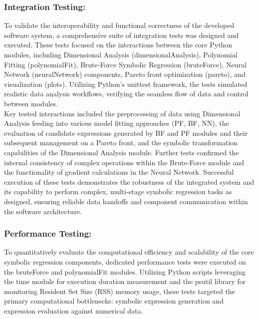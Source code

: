 \documentclass{article}
\begin{document}
\subsubsection{Integration Testing: }


To validate the interoperability and functional correctness of the developed software system, a comprehensive suite of integration tests was designed and executed. These tests focused on the interactions between the core Python modules, including Dimensional Analysis (dimensionalAnalysis), Polynomial Fitting (polynomialFit), Brute-Force Symbolic Regression (bruteForce), Neural Network (neuralNetwork) components, Pareto front optimization (pareto), and visualization (plots). Utilizing Python's unittest framework, the tests simulated realistic data analysis workflows, verifying the seamless flow of data and control between modules.\\

Key tested interactions included the preprocessing of data using Dimensional Analysis feeding into various model fitting approaches (PF, BF, NN), the evaluation of candidate expressions generated by BF and PF modules and their subsequent management on a Pareto front, and the symbolic transformation capabilities of the Dimensional Analysis module. Further tests confirmed the internal consistency of complex operations within the Brute-Force module and the functionality of gradient calculations in the Neural Network. Successful execution of these tests demonstrates the robustness of the integrated system and its capability to perform complex, multi-stage symbolic regression tasks as designed, ensuring reliable data handoffs and component communication within the software architecture.\\


\subsubsection{Performance Testing: }

To quantitatively evaluate the computational efficiency and scalability of the core symbolic regression components, dedicated performance tests were executed on the bruteForce and polynomialFit modules. Utilizing Python scripts leveraging the time module for execution duration measurement and the psutil library for monitoring Resident Set Size (RSS) memory usage, these tests targeted the primary computational bottlenecks: symbolic expression generation and expression evaluation against numerical data.\\
\end{document}
